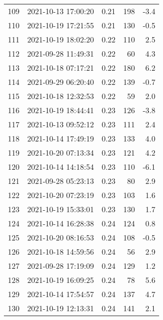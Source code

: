 \begin{tabular}{llrrr}
109 & 2021-10-13 17:00:20 &  0.21 &             198 &                   -3.4 \\
110 & 2021-10-19 17:21:55 &  0.21 &             130 &                   -0.5 \\
111 & 2021-10-19 18:02:20 &  0.22 &             110 &                    2.5 \\
112 & 2021-09-28 11:49:31 &  0.22 &              60 &                    4.3 \\
113 & 2021-10-18 07:17:21 &  0.22 &             180 &                    6.2 \\
114 & 2021-09-29 06:20:40 &  0.22 &             139 &                   -0.7 \\
115 & 2021-10-18 12:32:53 &  0.22 &              59 &                    2.0 \\
116 & 2021-10-19 18:44:41 &  0.23 &             126 &                   -3.8 \\
117 & 2021-10-13 09:52:12 &  0.23 &             111 &                    2.4 \\
118 & 2021-10-14 17:49:19 &  0.23 &             133 &                    4.0 \\
119 & 2021-10-20 07:13:34 &  0.23 &             121 &                    4.2 \\
120 & 2021-10-14 14:18:54 &  0.23 &             110 &                   -6.1 \\
121 & 2021-09-28 05:23:13 &  0.23 &              80 &                    2.9 \\
122 & 2021-10-20 07:23:19 &  0.23 &             103 &                    1.6 \\
123 & 2021-10-19 15:33:01 &  0.23 &             130 &                    1.7 \\
124 & 2021-10-14 16:28:38 &  0.24 &             124 &                    0.8 \\
125 & 2021-10-20 08:16:53 &  0.24 &             108 &                   -0.5 \\
126 & 2021-10-18 14:59:56 &  0.24 &              56 &                    2.9 \\
127 & 2021-09-28 17:19:09 &  0.24 &             129 &                    1.2 \\
128 & 2021-10-19 16:09:25 &  0.24 &              78 &                    5.6 \\
129 & 2021-10-14 17:54:57 &  0.24 &             137 &                    4.7 \\
130 & 2021-10-19 12:13:31 &  0.24 &             141 &                    2.1 \\

\end{tabular}
